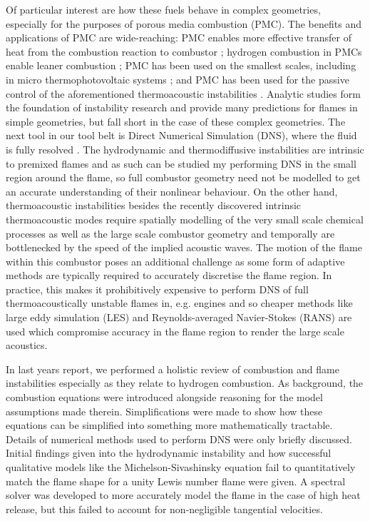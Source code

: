 Of particular interest are how these fuels behave in complex geometries, especially for the purposes of porous media combustion (PMC). The benefits and applications of PMC are wide-reaching: PMC enables more effective transfer of heat from the combustion reaction to combustor \cite{mujeebu2009CombustionPorousMedia}; hydrogen combustion in PMCs enable leaner combustion \cite{tseng2002EffectsHydrogenAddition}; PMC has been used on the smallest scales, including in micro thermophotovoltaic systems \cite{pan2015HydrogenOxygenPremixed}; and PMC has been used for the passive control of the aforementioned thermoacoustic instabilities \cite{meadows2015PorousInsertsPassive, dowd2018ThermoacousticInstabilityModel}. Analytic studies form the foundation of instability research and provide many predictions for flames in simple geometries, but fall short in the case of these complex geometries. The next tool in our tool belt is Direct Numerical Simulation (DNS), where the fluid is fully resolved \cite{orszag1970AnalyticalTheoriesTurbulence}. The hydrodynamic and thermodiffusive instabilities are intrinsic to premixed flames and as such can be studied my performing DNS in the small region around the flame, so full combustor geometry need not be modelled to get an accurate understanding of their nonlinear behaviour. On the other hand, thermoacoustic instabilities besides the recently discovered intrinsic thermoacoustic modes \cite{silva2023IntrinsicThermoacousticInstabilities} require spatially modelling of the very small scale chemical processes as well as the large scale combustor geometry and temporally are bottlenecked by the speed of the implied acoustic waves. The motion of the flame within this combustor poses an additional challenge as some form of adaptive methods are typically required to accurately discretise the flame region. In practice, this makes it prohibitively expensive to perform DNS of full thermoacoustically unstable flames in, e.g. engines and so cheaper methods like large eddy simulation (LES) and Reynolds-averaged Navier-Stokes (RANS) are used which compromise accuracy in the flame region to render the large scale acoustics.

In last years report, we performed a holistic review of combustion and flame instabilities especially as they relate to hydrogen combustion. As background, the combustion equations were introduced alongside reasoning for the model assumptions made therein. Simplifications were made to show how these equations can be simplified into something more mathematically tractable. Details of numerical methods used to perform DNS were only briefly discussed. Initial findings given into the hydrodynamic instability and how successful qualitative models like the Michelson-Sivashinsky equation \cite{sivashinsky1977NonlinearAnalysisHydrodynamic, michelson1977NonlinearAnalysisHydrodynamic} fail to quantitatively match the flame shape for a unity Lewis number flame were given. A spectral solver was developed to more accurately model the flame in the case of high heat release, but this failed to account for non-negligible tangential velocities.


